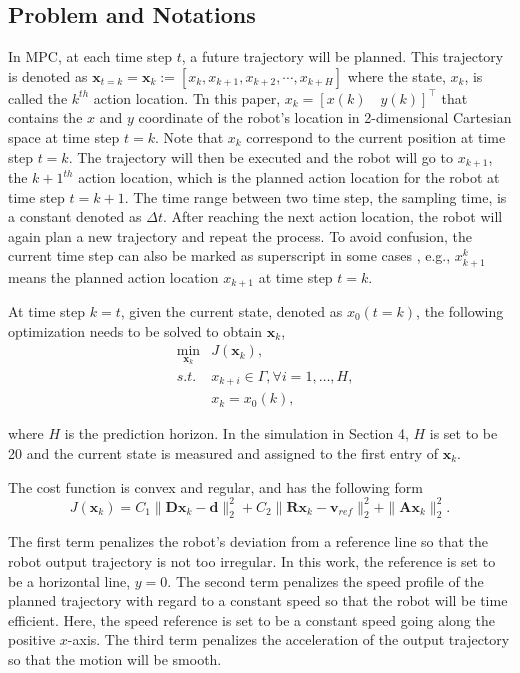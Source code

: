 \documentclass{ifacconf}
\begin{document}
\subsection{Problem and Notations}
In MPC, at each time step $t$, a future trajectory will be planned. This trajectory is denoted as $\mathbf{x}_{t=k}=\mathbf{x}_{k} := [x_k, x_{k+1},x_{k+2},\cdots,x_{k+H}]$ where the state, $x_k$, is called the $k^{th}$ action location. Tn this paper, $x_k= [x(k)\quad y(k)]^{\intercal}$ that contains the $x$ and $y$ coordinate of the robot's location in 2-dimensional Cartesian space at time step $t=k$. Note that $x_k$ correspond to the current position at time step $t=k$. The trajectory will then be executed and the robot will go to $x_{k+1}$, the $k+1^{th}$ action location, which is the planned action location for the robot at time step $t=k+1$. The time range between two time step, the sampling time, is a constant denoted as $\Delta t$. After reaching the next action location, the robot will again plan a new trajectory and repeat the process. To avoid confusion, the current time step can also be marked as superscript in some cases , e.g., $x_{k+1}^k$ means the planned action location $x_{k+1}$ at time step $t=k$.

At time step $k=t$, given the current state, denoted as $x_0(t=k)$, the following optimization needs to be solved to obtain $\mathbf{x}_k$,
\begin{eqnarray}
&\min_{\mathbf{x}_{k}} & J(\mathbf{x}_k),\\
&s.t.& x_{k+i}\in\Gamma,\forall i=1,\ldots,H,\\
&&         x_{k}=x_0(k),
\end{eqnarray}

where $H$ is the prediction horizon. In the simulation in Section 4, $H$ is set to be 20 and the current state is measured and assigned to the first entry of $\mathbf{x}_{k}$.

\begin{assum}[Cost]
The cost function is convex and regular, and has the following form
\begin{equation}
J(\mathbf{x}_k) = C_1\|\mathbf{D}\mathbf{x}_k-\mathbf{d}\|_{2}^2 + C_2 \|\mathbf{R}\mathbf{x}_k-\mathbf{v}_{ref}\|_2^2 +\|\mathbf{A}\mathbf{x}_{k}\|_2^2.  
\end{equation}
\end{assum}

The first term penalizes the robot's deviation from a reference line so that the robot output trajectory is not too irregular. In this work, the reference is set to be a horizontal line, $y=0$. The second term penalizes the speed profile of the planned trajectory with regard to a constant speed so that the robot will be time efficient. Here, the speed reference is set to be a constant speed going along the positive $x$-axis. The third term penalizes the acceleration of the output trajectory so that the motion will be smooth.
\end{document}
